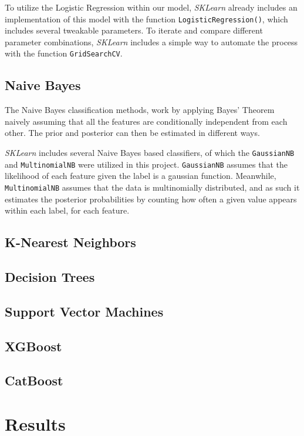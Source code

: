 \documentclass{IEEEtran}
\begin{document}
To utilize the Logistic Regression within our model, \textit{SKLearn} already includes an implementation of this model with the function \texttt{LogisticRegression()}, which includes several tweakable parameters. To iterate and compare different parameter combinations, \textit{SKLearn} includes a simple way to automate the process with the function \texttt{GridSearchCV}.

\subsection{Naive Bayes}

The Naive Bayes classification methods, work by applying Bayes' Theorem naively assuming that all the features are conditionally independent from each other. The prior and posterior can then be estimated in different ways.

\textit{SKLearn} includes several Naive Bayes based classifiers, of which the \texttt{GaussianNB} and \texttt{MultinomialNB} were utilized in this project. \texttt{GaussianNB} assumes that the likelihood of each feature given the label is a gaussian function. Meanwhile, \texttt{MultinomialNB} assumes that the data is multinomially distributed, and as such it estimates the posterior probabilities by counting how often a given value appears within each label, for each feature. 

\subsection{K-Nearest Neighbors}

\subsection{Decision Trees}

\subsection{Support Vector Machines}

\subsection{XGBoost}

\subsection{CatBoost}

\section{Results}
\end{document}
